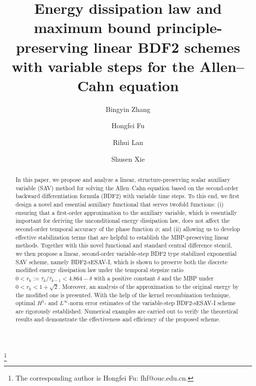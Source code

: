 \documentclass{m2an}
\begin{document}
\title{Energy dissipation law and maximum bound principle-preserving linear  BDF2 schemes with variable steps for the Allen--Cahn equation}\thanks{The corresponding author is Hongfei Fu: fhf@ouc.edu.cn.}%
%
\author{Bingyin Zhang}\address{School of Mathematical Sciences \& Laboratory of Marine Mathematics, Ocean University of China, Qingdao  266100, China}
\author{Hongfei Fu}%
\author{Rihui Lan}
\author{Shusen Xie}
%
%
\begin{abstract} 
	In this paper, we propose and analyze a linear, structure-preserving scalar auxiliary variable (SAV) method for solving the Allen--Cahn equation based on the second-order backward differentiation formula (BDF2) with variable time steps.  To this end, we first design a novel and essential auxiliary functional that serves twofold functions: (i) ensuring that a first-order approximation to the auxiliary variable, which is essentially important for deriving the unconditional energy dissipation law, does not affect the second-order temporal accuracy of the phase function $\phi$; and (ii) allowing us to develop effective stabilization terms that are helpful to establish the MBP-preserving linear methods. Together with this novel functional and standard central difference stencil, we then propose a linear, second-order variable-step BDF2 type stabilized exponential SAV scheme, namely BDF2-sESAV-I, which is shown to preserve both the discrete modified energy dissipation law under the temporal stepsize ratio $ 0 < r_{k} := \tau_{k}/\tau_{k-1} < 4.864 - \delta $ with a positive constant $\delta$ and the MBP under $ 0 < r_{k} < 1 + \sqrt{2} $. Moreover, an analysis of the approximation to the original energy by the modified one is presented. With the help of the kernel recombination technique, optimal $ H^{1}$- and $ L^{\infty}$-norm error estimates of the variable-step BDF2-sESAV-I scheme are rigorously established. Numerical examples are carried out to verify the theoretical results and demonstrate the effectiveness and efficiency of the proposed scheme.
\end{abstract}
%
%
%
%
\maketitle
\end{document}
